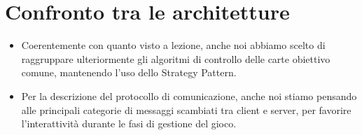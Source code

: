 \documentclass[a4paper,11pt]{article} %
\begin{document}
    \section{Confronto tra le architetture}\label{sec:confronto-tra-le-architetture}
    \begin{itemize}
        \item Coerentemente con quanto visto a lezione, anche noi abbiamo scelto di raggruppare
        ulteriormente gli algoritmi di controllo delle carte obiettivo comune, mantenendo l'uso
        dello Strategy Pattern.
        \item Per la descrizione del protocollo di comunicazione, anche noi stiamo pensando alle principali
        categorie di messaggi scambiati tra client e server, per favorire l'interattività durante le fasi di gestione del gioco.
    \end{itemize}
\end{document}
